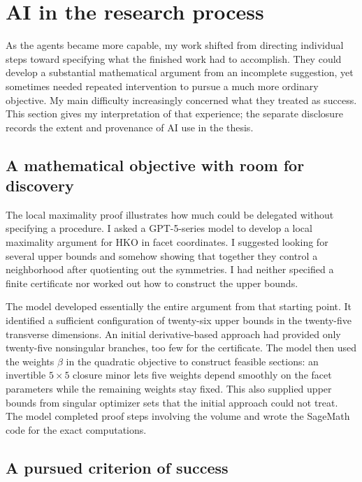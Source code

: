 \clearpage
\section{AI in the research process}
\label{sec:use-of-ai}

As the agents became more capable, my work shifted from directing individual
steps toward specifying what the finished work had to accomplish. They could
develop a substantial mathematical argument from an incomplete suggestion,
yet sometimes needed repeated intervention to pursue a much more ordinary
objective. My main difficulty increasingly concerned what they treated as
success. This section gives my interpretation of that experience; the separate
disclosure records the extent and provenance of AI use in the thesis.

\subsection{A mathematical objective with room for discovery}

The local maximality proof illustrates how much could be delegated without
specifying a procedure. I asked a GPT-5-series model to develop a local
maximality argument for HKO in facet coordinates. I suggested looking for
several upper bounds and somehow showing that together they control a
neighborhood after quotienting out the symmetries. I had neither specified a
finite certificate nor worked out how to construct the upper bounds.

The model developed essentially the entire argument from that starting
point. It identified a sufficient configuration of twenty-six upper bounds
in the twenty-five transverse dimensions. An initial derivative-based
approach had provided only twenty-five nonsingular branches, too few for the
certificate. The model then used the weights $\beta$ in the quadratic
objective to construct feasible sections: an invertible $5\times5$ closure
minor lets five weights depend smoothly on the facet parameters while the
remaining weights stay fixed. This also supplied upper bounds from singular
optimizer sets that the initial approach could not treat. The model completed
proof steps involving the volume and wrote the SageMath code for the exact
computations.

\subsection{A pursued criterion of success}

